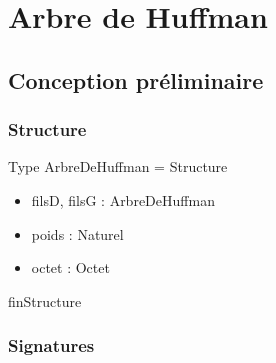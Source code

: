    \section*{Arbre de Huffman}
    \subsection*{Conception préliminaire}
    \subsubsection*{Structure}

    Type ArbreDeHuffman = Structure
	\begin{itemize}[label=$\ $, leftmargin=2cm]
		 \item filsD, filsG : ArbreDeHuffman
		 \item poids : Naturel
		 \item octet : Octet 
	\end{itemize}
    finStructure
    
    \subsubsection*{Signatures}

